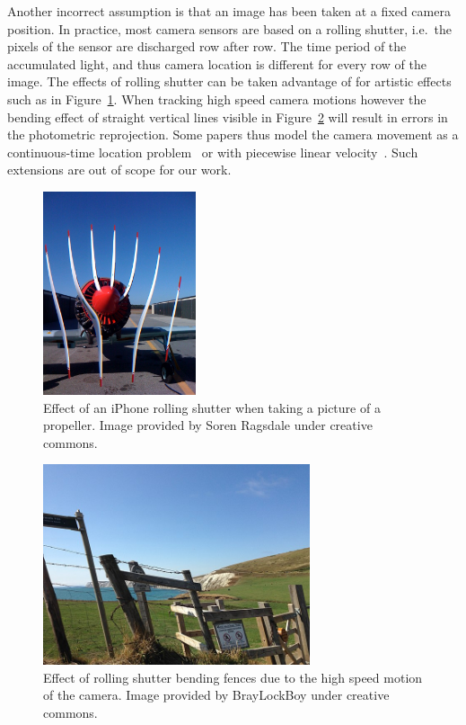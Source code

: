 Another incorrect assumption is that an image has been taken at a fixed camera position.
In practice, most camera sensors are based on a rolling shutter,
i.e.\ the pixels of the sensor are discharged row after row.
The time period of the accumulated light, and thus camera location is different
for every row of the image.
The effects of rolling shutter can be taken advantage of for artistic effects
such as in Figure~\ref{fig:rolling_shutter_prop}.
When tracking high speed camera motions however the bending effect of straight
vertical lines visible in Figure~\ref{fig:rolling_shutter_bend}
will result in errors in the photometric reprojection.
Some papers thus model the camera movement as
a continuous-time location problem~\cite{kerl2015dense}
or with piecewise linear velocity~\cite{schubert2019rolling}.
Such extensions are out of scope for our work.

\begin{figure}[h]
\centering
\includegraphics[width=0.4\textwidth]{assets/img/rolling-shutter-prop.jpg}
\caption{Effect of an iPhone rolling shutter when taking a picture
of a propeller. Image provided by Soren Ragsdale under creative commons.}%
\label{fig:rolling_shutter_prop}
\end{figure}

\begin{figure}[h]
\centering
\includegraphics[width=0.7\textwidth]{assets/img/rolling-shutter-bend.jpg}
\caption{Effect of rolling shutter bending fences due to the high speed motion
of the camera. Image provided by BrayLockBoy under creative commons.}%
\label{fig:rolling_shutter_bend}
\end{figure}
